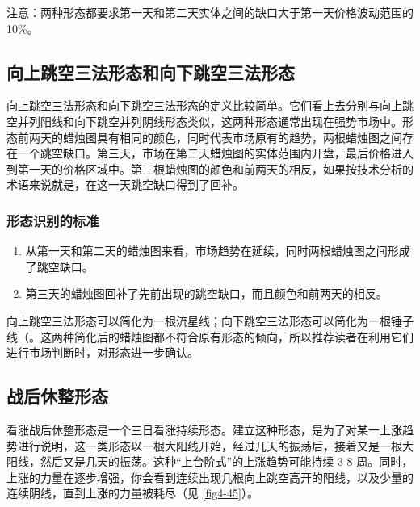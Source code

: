\begin{tcolorbox}
    注意：两种形态都要求第一天和第二天实体之间的缺口大于第一天价格波动范围的 10\%。
\end{tcolorbox}
\subsection{向上跳空三法形态和向下跳空三法形态}
向上跳空三法形态和向下跳空三法形态的定义比较简单。它们看上去分别与向上跳空并列阳线和向下跳空并列阴线形态类似，这两种形态通常出现在强势市场中。形态前两天的蜡烛图具有相同的颜色，同时代表市场原有的趋势，两根蜡烛图之间存在一个跳空缺口。第三天，市场在第二天蜡烛图的实体范围内开盘，最后价格进入到第一天的价格区域中。第三根蜡烛图的颜色和前两天的相反，如果按技术分析的术语来说就是，在这一天跳空缺口得到了回补。


\subsubsection*{形态识别的标准}
\begin{enumerate}
    \item 从第一天和第二天的蜡烛图来看，市场趋势在延续，同时两根蜡烛图之间形成了跳空缺口。
    \item 第三天的蜡烛图回补了先前出现的跳空缺口，而且颜色和前两天的相反。
\end{enumerate}

向上跳空三法形态可以简化为一根流星线；向下跳空三法形态可以简化为一根锤子线（。这两种简化后的蜡烛图都不符合原有形态的倾向，所以推荐读者在利用它们进行市场判断时，对形态进一步确认。
\subsection{战后休整形态}
看涨战后休整形态是一个三日看涨持续形态。建立这种形态，是为了对某一上涨趋势进行说明，这一类形态以一根大阳线开始，经过几天的振荡后，接着又是一根大阳线，然后又是几天的振荡。这种“上台阶式”的上涨趋势可能持续 3-8 周。同时，上涨的力量在逐步增强，你会看到连续出现几根向上跳空高开的阳线，以及少量的连续阴线，直到上涨的力量被耗尽（见 \autoref{fig4-45}）。

